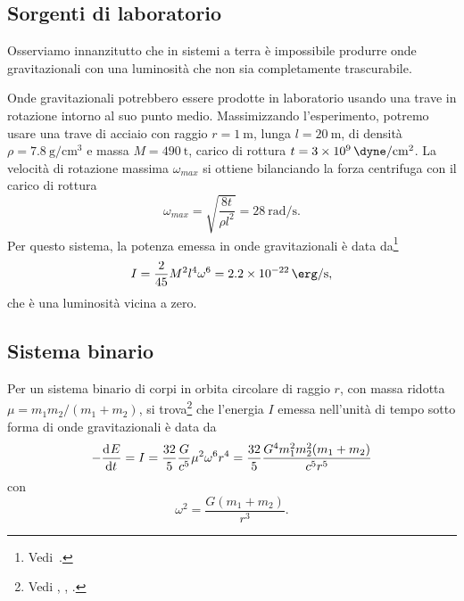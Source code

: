 \subsection{Sorgenti di laboratorio}
\label{sec:sorgenti-laboratorio}

Osserviamo innanzitutto che in sistemi a terra è impossibile produrre onde
gravitazionali con una luminosità che non sia completamente trascurabile.

Onde gravitazionali potrebbero essere prodotte in laboratorio usando una trave
in rotazione intorno al suo punto medio.  Massimizzando l'esperimento, potremo
usare una trave di acciaio con raggio $r = \SI{1}{\metre}$, lunga $l =
\SI{20}{\metre}$, di densità $\rho = \SI{7.8}{\gram\per\centi\metre\cubed}$ e
massa $M = \SI{490}{\tonne}$, carico di rottura $t =
\SI{3e9}{\dyne\per\centi\metre\squared}$.  La velocità di rotazione massima
$\omega_{max}$ si ottiene bilanciando la forza centrifuga con il carico di
rottura
\begin{equation}
  \omega_{max} = \sqrt{\frac{8t}{\rho l^{2}}} = \SI{28}{\radian\per\second}.
\end{equation}
Per questo sistema, la potenza emessa in onde gravitazionali è data
da\footnote{Vedi~\textcite[980]{misner:gravitation}.}
\begin{equation}
  I = \frac{2}{45} M^{2} l^{4} \omega^{6} = \SI{2.2e-22}{\erg\per\second},
\end{equation}
che è una luminosità vicina a zero.

\subsection{Sistema binario}
\label{sec:sistema-binario}

Per un sistema binario di corpi in orbita circolare di raggio $r$, con massa
ridotta $\mu = m_{1}m_{2}/(m_{1} + m_{2})$, si trova\footnote{Vedi
  \textcite[461]{landau:campi}, \textcite[986]{misner:gravitation},
  \textcite[476]{shapiro:black-holes}.}  che l'energia $I$ emessa nell'unità di
tempo sotto forma di onde gravitazionali è data da
\begin{equation}
  \label{eq:potenza-onde-sistema-binario}
  -\frac{{\mathop{}\!\mathrm{d}^{}}E}{\mathop{}\!\mathrm{d} {t}^{}} = I = \frac{32}{5} \frac{G}{c^{5}} \mu^{2} \omega^{6} r^{4} =
  \frac{32}{5} \frac{G^{4} m_{1}^{2} m_{2}^{2} (m_{1} + m_{2})}{c^{5}r^{5}}
\end{equation}
con
\begin{equation}
  \omega^{2} = \frac{G(m_{1} + m_{2})}{r^{3}}.
\end{equation}

